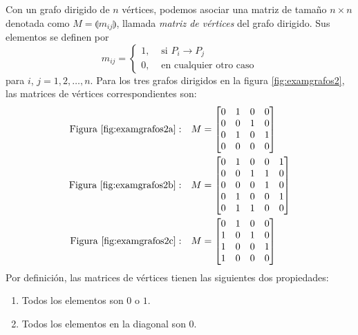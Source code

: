 \noindent Con un grafo dirigido de $n$ vértices, podemos asociar una matriz de tamaño $n \times n$ denotada como $M = \llparenthesis m_{ij} \rrparenthesis$, llamada \emph{matriz de vértices} del grafo dirigido. Sus elementos se definen por
$$m_{ij} = \begin{cases}
    1, & \text{ si } P_i \rightarrow P_j \\
    0, & \text{ en cualquier otro caso}
\end{cases}$$
para $i$, $j = 1, 2, \dots, n$. Para los tres grafos dirigidos en la figura \ref{fig:examgrafos2}, las matrices de vértices correspondientes son:
\begin{align*}
    \text{Figura \ref{fig:examgrafos2a}}: & & M & = \begin{bmatrix} 0 & 1 & 0 & 0 \\ 0 & 0 & 1 & 0 \\ 0 & 1 & 0 & 1 \\ 0 & 0 & 0 & 0 \end{bmatrix} \\
    \text{Figura \ref{fig:examgrafos2b}}: & & M & = \begin{bmatrix} 0 & 1 & 0 & 0 & 1 \\ 0 & 0 & 1 & 1 & 0 \\ 0 & 0 & 0 & 1 & 0 \\ 0 & 1 & 0 & 0 & 1 \\ 0 & 1 & 1 & 0 & 0 \end{bmatrix} \\
    \text{Figura \ref{fig:examgrafos2c}}: & & M & = \begin{bmatrix} 0 & 1 & 0 & 0 \\ 1 & 0 & 1 & 0 \\ 1 & 0 & 0 & 1 \\ 1 & 0 & 0 & 0 \end{bmatrix}
\end{align*}
Por definición, las matrices de vértices tienen las siguientes dos propiedades:
\begin{enumerate}[label=\roman*)]
    \item Todos los elementos son $0$ o $1$.
    \item Todos los elementos en la diagonal son $0$.
\end{enumerate}
